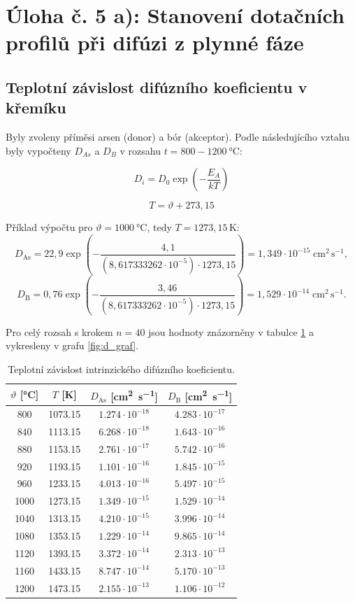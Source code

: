 \documentclass[11pt,a4paper]{article}
\begin{document}
\section{Úloha č. 5 a): Stanovení dotačních profilů při difúzi z plynné fáze}
\subsection{Teplotní závislost difúzního koeficientu v křemíku}
Byly zvoleny příměsi arsen (donor) a bór (akceptor). Podle následujícího vztahu byly vypočteny $D_{As}$ a $D_B$ v rozsahu $t=800-1200\  \si{\degreeCelsius}$:

\[
D_i = D_0 \exp\left(-\frac{E_A}{kT}\right)
\]

\[
T = \vartheta + 273{,}15
\]

Příklad výpočtu pro $\vartheta=\SI{1000}{\degreeCelsius}$, tedy $T=1273{,}15\,\mathrm{K}$:
\[
D_{\mathrm{As}}=22{,}9\exp\!\left(-\frac{4{,}1}{(8{,}617333262\cdot10^{-5})\cdot1273{,}15}\right)
=1{,}349\cdot10^{-15}\;\mathrm{cm^2\,s^{-1}},
\]
\[
D_{\mathrm B}=0{,}76\exp\!\left(-\frac{3{,}46}{(8{,}617333262\cdot10^{-5})\cdot1273{,}15}\right)
=1{,}529\cdot10^{-14}\;\mathrm{cm^2\,s^{-1}}.
\]

Pro celý rozsah s krokem $n=40$ jsou hodnoty znázorněny v tabulce \ref{tab:din} a vykresleny v grafu \ref{fig:d_graf}.

\begin{table}[H]
\centering
\begin{tabular}{|c|c|c|c|}
\hline
$\vartheta$ [\si{\degreeCelsius}] & $T$ [K] & $D_{\mathrm{As}}$ [\si{\centi\meter\squared\per\second}] & $D_{\mathrm B}$ [\si{\centi\meter\squared\per\second}]\\ \hline
800 & 1073.15 & $1.274\cdot 10^{-18}$ & $4.283\cdot 10^{-17}$ \\ \hline
840 & 1113.15 & $6.268\cdot 10^{-18}$ & $1.643\cdot 10^{-16}$ \\ \hline
880 & 1153.15 & $2.761\cdot 10^{-17}$ & $5.742\cdot 10^{-16}$ \\ \hline
920 & 1193.15 & $1.101\cdot 10^{-16}$ & $1.845\cdot 10^{-15}$ \\ \hline
960 & 1233.15 & $4.013\cdot 10^{-16}$ & $5.497\cdot 10^{-15}$ \\ \hline
1000 & 1273.15 & $1.349\cdot 10^{-15}$ & $1.529\cdot 10^{-14}$ \\ \hline
1040 & 1313.15 & $4.210\cdot 10^{-15}$ & $3.996\cdot 10^{-14}$ \\ \hline
1080 & 1353.15 & $1.229\cdot 10^{-14}$ & $9.865\cdot 10^{-14}$ \\ \hline
1120 & 1393.15 & $3.372\cdot 10^{-14}$ & $2.313\cdot 10^{-13}$ \\ \hline
1160 & 1433.15 & $8.747\cdot 10^{-14}$ & $5.170\cdot 10^{-13}$ \\ \hline
1200 & 1473.15 & $2.155\cdot 10^{-13}$ & $1.106\cdot 10^{-12}$ \\ \hline
\end{tabular}
\caption{Teplotní závislost intrinzického difúzního koeficientu.}
\label{tab:din}
\end{table}
\end{document}
